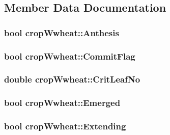 \subsection{Member Data Documentation}
\hypertarget{classcrop_wwheat_aa7ae2a24c245254748efd6393dc6995f}{
\subsubsection[{Anthesis}]{\setlength{\rightskip}{0pt plus 5cm}bool {\bf cropWwheat::Anthesis}}}
\label{classcrop_wwheat_aa7ae2a24c245254748efd6393dc6995f}
\hypertarget{classcrop_wwheat_ae8060d1a4163cc8244cc5777d5c8f3ec}{
\subsubsection[{CommitFlag}]{\setlength{\rightskip}{0pt plus 5cm}bool {\bf cropWwheat::CommitFlag}}}
\label{classcrop_wwheat_ae8060d1a4163cc8244cc5777d5c8f3ec}
\hypertarget{classcrop_wwheat_a70dc1057062a1f5253c85489f8e81b8c}{
\subsubsection[{CritLeafNo}]{\setlength{\rightskip}{0pt plus 5cm}double {\bf cropWwheat::CritLeafNo}}}
\label{classcrop_wwheat_a70dc1057062a1f5253c85489f8e81b8c}
\hypertarget{classcrop_wwheat_a20586dec607d8ba2aad31484c111a7d0}{
\subsubsection[{Emerged}]{\setlength{\rightskip}{0pt plus 5cm}bool {\bf cropWwheat::Emerged}}}
\label{classcrop_wwheat_a20586dec607d8ba2aad31484c111a7d0}
\hypertarget{classcrop_wwheat_ae8abed987e9a9d614c805b4ca94aeb7b}{
\subsubsection[{Extending}]{\setlength{\rightskip}{0pt plus 5cm}bool {\bf cropWwheat::Extending}}}

